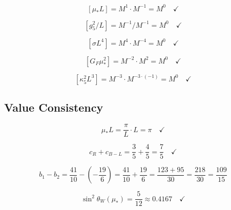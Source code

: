 \documentclass[11pt,a4paper]{article}
\theoremstyle{definition}
\begin{document}
\begin{equation}
\label{eq:dim_check_1}
[\mu_* L] = M^1 \cdot M^{-1} = M^0 \quad \checkmark
\end{equation}

\begin{equation}
\label{eq:dim_check_2}
[g_5^2 / L] = M^{-1} / M^{-1} = M^0 \quad \checkmark
\end{equation}

\begin{equation}
\label{eq:dim_check_3}
[\sigma L^4] = M^4 \cdot M^{-4} = M^0 \quad \checkmark
\end{equation}

\begin{equation}
\label{eq:dim_check_4}
[G_F \mu_*^2] = M^{-2} \cdot M^2 = M^0 \quad \checkmark
\end{equation}

\begin{equation}
\label{eq:dim_check_5}
[\kappa_5^2 L^3] = M^{-3} \cdot M^{-3 \cdot (-1)} = M^0 \quad \checkmark
\end{equation}

\subsection{Value Consistency}
\label{subsec:value_consistency}

\begin{equation}
\label{eq:val_check_1}
\mu_* L = \frac{\pi}{L} \cdot L = \pi \quad \checkmark
\end{equation}

\begin{equation}
\label{eq:val_check_2}
c_R + c_{B-L} = \frac{3}{5} + \frac{4}{5} = \frac{7}{5} \quad \checkmark
\end{equation}

\begin{equation}
\label{eq:val_check_3}
b_1 - b_2 = \frac{41}{10} - \left(-\frac{19}{6}\right) = \frac{41}{10} + \frac{19}{6} = \frac{123 + 95}{30} = \frac{218}{30} = \frac{109}{15}
\end{equation}

\begin{equation}
\label{eq:val_check_4}
\sin^2\theta_W(\mu_*) = \frac{5}{12} \approx 0.4167 \quad \checkmark
\end{equation}
\end{document}
